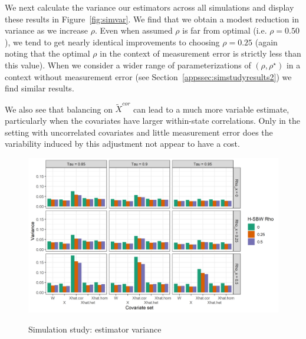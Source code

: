 We next calculate the variance our estimators across all simulations and display these results in Figure~\ref{fig:simvar}. We find that we obtain a modest reduction in variance as we increase $\rho$. Even when assumed $\rho$ is far from optimal (i.e. $\rho = 0.50$), we tend to get nearly identical improvements to choosing $\rho = 0.25$ (again noting that the optimal $\rho$ in the context of measurement error is strictly less than this value). When we consider a wider range of parameterizations of $(\rho, \rho^\star)$ in a context without measurement error (see Section~\ref{appssec:simstudyresults2}) we find similar results.

We also see that balancing on $\tilde{X}^{cor}$ can lead to a much more variable estimate, particularly when the covariates have larger within-state correlations. Only in the setting with uncorrelated covariates and little measurement error does the variability induced by this adjustment not appear to have a cost.

\begin{figure}[H]
\begin{center}
    \caption{Simulation study: estimator variance}\label{fig:simvar}
    \label{fig:loveplotc1}
    \includegraphics[scale=0.5]{01_Plots/var-plot.png}
\end{center}
\end{figure}

